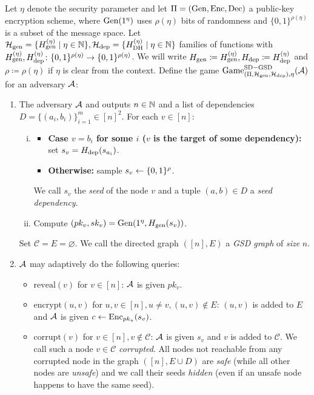 \begin{definition} \label{def:sd-gsd-game}
	Let $\eta$ denote the security parameter and let $\Pi = (\mathrm{Gen}, \mathrm{Enc}, \mathrm{Dec})$ a public-key encryption scheme, where $\mathrm{Gen}(1^\eta)$ uses $\rho(\eta)$ bits of randomness and $\{0, 1\}^{\rho(\eta)}$ is a subset of the message space.
	Let $\mathcal{H}_\mathrm{gen} = \{ H_\mathrm{gen}^{(\eta)} \mid \eta \in \mathbb{N}\}, \mathcal{H}_\mathrm{dep} = \{ H_\mathrm{DH}^{(\eta)} \mid \eta \in \mathbb{N}\}$ families of functions with $H_\mathrm{gen}^{(\eta)}, H_\mathrm{dep}^{(\eta)} \colon \{0, 1\}^{\rho(\eta)} \to \{0, 1\}^{\rho(\eta)}$. We will write $H_\mathrm{gen} \coloneqq H_\mathrm{gen}^{(\eta)}, H_\mathrm{dep} \coloneqq H_\mathrm{dep}^{(\eta)}$ and $\rho \coloneqq \rho(\eta)$ if $\eta$ is clear from the context.
	Define the game $\mathrm{Game}_{(\Pi, \mathcal{H}_\mathrm{gen}, \mathcal{H}_\mathrm{dep}), \eta}^{\mathrm{SD-GSD}}(\mathcal{A})$ for an adversary $\mathcal{A}$:
	\begin{enumerate}[1.]
		\item \label{def:sd-gsd-game-step-init} The adversary $\mathcal{A}$ and outputs $n \in \mathbb{N}$ and a list of dependencies $D = \{(a_{i}, b_{i})\}_{i=1}^m \in [n]^2$. For each $v \in [n]$:
		      \begin{enumerate}[(i)]
			      \item \begin{itemize}
				            \item \textbf{Case $v = b_i$ for some $i$ ($v$ is the target of some dependency):} set $s_v = H_\mathrm{dep}(s_{a_i})$.
				            \item \textbf{Otherwise:} sample $s_v \leftarrow \{0, 1\}^\rho$.
			            \end{itemize}
			            We call $s_v$ the \emph{seed} of the node $v$ and a tuple $(a, b) \in D$ a \emph{seed dependency}.
			      \item Compute $(pk_v, sk_v) = \mathrm{Gen}(1^\eta, H_\mathrm{gen}(s_v))$.
		      \end{enumerate}
		      Set $\mathcal{C} = E = \varnothing$. We call the directed graph $([n], E)$ a \emph{GSD graph} of \emph{size} $n$.
		\item $\mathcal{A}$ may adaptively do the following queries:
		      \begin{itemize}
			      \item $\mathrm{reveal}(v)$ for $v \in [n]$: $\mathcal{A}$ is given $pk_v$.
			      \item $\mathrm{encrypt}(u, v)$ for $u, v \in [n], u \neq v, (u, v) \notin E$: $(u, v)$ is added to $E$ and $\mathcal{A}$ is given $c \leftarrow \mathrm{Enc}_{pk_u}(s_v)$.
			      \item $\mathrm{corrupt}(v)$ for $v \in [n], v \notin \mathcal{C}$: $\mathcal{A}$ is given $s_v$ and $v$ is added to $\mathcal{C}$. We call such a node $v \in \mathcal{C}$ \emph{corrupted}. All nodes not reachable from any corrupted node in the graph $([n], E \cup D)$ are \emph{safe} (while all other nodes are \emph{unsafe}) and we call their seeds \emph{hidden} (even if an unsafe node happens to have the same seed).

\end{itemize}
\end{enumerate}
\end{definition}
